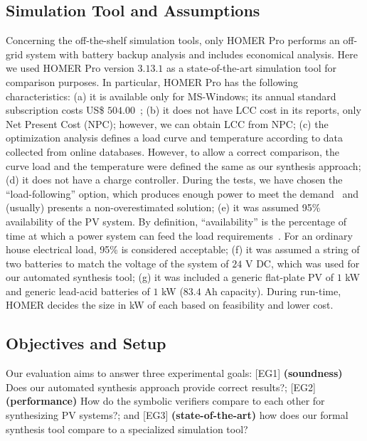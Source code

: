 \documentclass[runningheads]{llncs}
\begin{document}
\subsection{Simulation Tool and Assumptions}

Concerning the off-the-shelf simulation tools, only HOMER Pro performs an off-grid system with battery backup analysis and includes economical analysis. Here we used HOMER Pro version $3.13.1$ as a state-of-the-art simulation tool for comparison purposes. In particular, HOMER Pro has the following characteristics:
(a) it is available only for MS-Windows; its annual standard subscription costs US\$ $504.00$~\cite{HOMER}; 
(b) it does not have LCC cost in its reports, only Net Present Cost (NPC); however, we can obtain LCC from NPC; 
(c) the optimization analysis defines a load curve and temperature according to data collected from online databases. However, to allow a correct comparison, the curve load and the temperature were defined the same as our synthesis approach; 
(d) it does not have a charge controller. During the tests, we have chosen the ``load-following'' option, which produces enough power to meet the demand~\cite{HOMER} and (usually) presents a non-overestimated solution; 
(e) it was assumed 95\% availability of the PV system. By definition, ``availability'' is the percentage of time at which a power system can feed the load requirements~\cite{Khatib2014}. For an ordinary house electrical load, 95\% is considered acceptable;
(f) it was assumed a string of two batteries to match the voltage of the system of $24$ V DC, which was used for our automated synthesis tool; 
(g) it was included a generic flat-plate PV of $1$ kW and generic lead-acid batteries of $1$ kW ($83.4$ Ah capacity). During run-time, HOMER decides the size in kW of each based on feasibility and lower cost.

\subsection{Objectives and Setup}
Our evaluation aims to answer three experimental goals: [EG1] \textbf{(soundness)} Does our automated synthesis approach provide correct results?; [EG2] \textbf{(performance)} How do the symbolic verifiers compare to each other for synthesizing PV systems?; and [EG3] \textbf{(state-of-the-art)} how does our formal synthesis tool compare to a specialized simulation tool?
\end{document}

